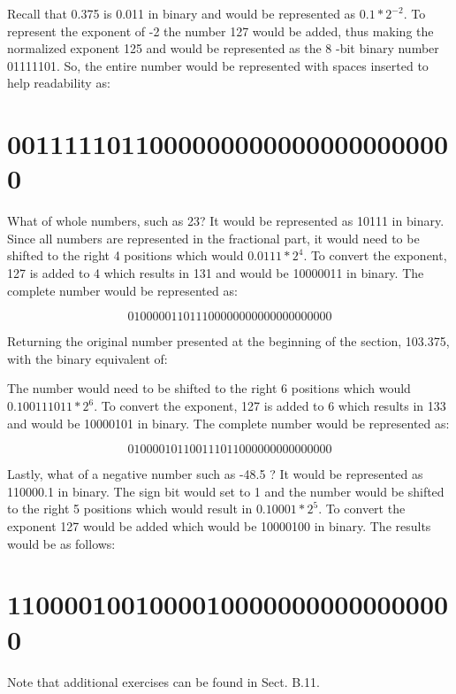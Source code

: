 \documentclass[10pt]{book}
\begin{document}
Recall that 0.375 is 0.011 in binary and would be represented as $0.1 * 2^{-2}$. To represent the exponent of -2 the number 127 would be added, thus making the normalized exponent 125 and would be represented as the 8 -bit binary number 01111101. So, the entire number would be represented with spaces inserted to help readability as:

\section*{00111110110000000000000000000000}
What of whole numbers, such as 23? It would be represented as 10111 in binary. Since all numbers are represented in the fractional part, it would need to be shifted to the right 4 positions which would $0.0111 * 2^{4}$. To convert the exponent, 127 is added to 4 which results in 131 and would be 10000011 in binary. The complete number would be represented as:

$$
010000011011100000000000000000000
$$

Returning the original number presented at the beginning of the section, 103.375, with the binary equivalent of:

The number would need to be shifted to the right 6 positions which would $0.100111011 * 2^{6}$. To convert the exponent, 127 is added to 6 which results in 133 and would be 10000101 in binary. The complete number would be represented as:

$$
010000101100111011000000000000000
$$

Lastly, what of a negative number such as -48.5 ? It would be represented as 110000.1 in binary. The sign bit would set to 1 and the number would be shifted to the right 5 positions which would result in $0.10001 * 2^{5}$. To convert the exponent 127 would be added which would be 10000100 in binary. The results would be as follows:

\section*{11000010010000100000000000000000}
Note that additional exercises can be found in Sect. B.11.
\end{document}
